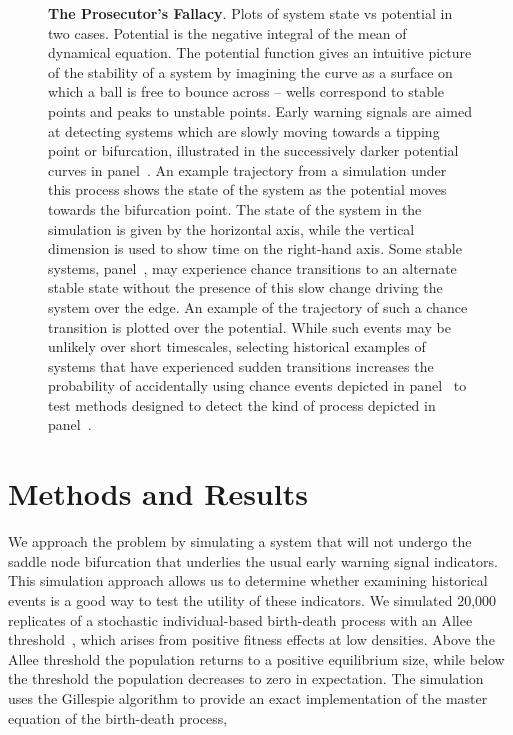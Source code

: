 \documentclass[authoryear,review,12pt]{elsarticle}
\begin{document}
\begin{figure}
  \begin{center}
     
  \end{center} \caption{\textbf{The Prosecutor's Fallacy}. Plots of system
  state vs potential in two cases.  Potential is the negative integral
  of the mean of dynamical equation.  The potential function gives an
  intuitive picture of the stability of a system by imagining the curve as
  a surface on which a ball is free to bounce across -- wells correspond
  to stable points and peaks to unstable points.  Early warning signals
  are aimed at detecting systems which are slowly moving towards a tipping
  point or bifurcation, illustrated in the successively darker potential
  curves in panel~.  An example trajectory from
  a simulation under this process shows the state of the system as the
  potential moves towards the bifurcation point. The state of the system
  in the simulation is given by the horizontal axis, while the vertical
  dimension is used to show time on the right-hand axis.  Some stable
  systems, panel~, may experience chance transitions
  to an alternate stable state without the presence of this slow change
  driving the system over the edge.  An example of the trajectory of
  such a chance transition is plotted over the potential.  While such
  events may be unlikely over short timescales, selecting historical
  examples of systems that have experienced sudden transitions increases
  the probability of accidentally using chance events depicted in
  panel~ to test methods designed to detect the kind
  of process depicted in panel~.} \label{fig:1}
\end{figure}




\section{Methods and Results}
We approach the problem by simulating a system that will not undergo the
saddle node bifurcation that underlies the usual early warning signal
indicators.  This simulation approach allows us to determine whether
examining historical events is a good way to test the utility of these
indicators.  We simulated 20,000 replicates of a stochastic individual-based
birth-death process with an Allee threshold~\citep{Courchamp2008}, which
arises from positive fitness effects at low densities.  Above the Allee
threshold the population returns to a positive equilibrium size, while
below the threshold the population decreases to zero in expectation. The
simulation uses the Gillespie algorithm to provide an exact implementation
of the master equation of the birth-death process,
\end{document}
